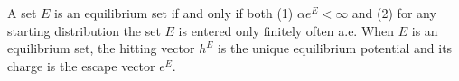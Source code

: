 A set $E$ is an equilibrium set if and only if both (1) $\alpha e^E < \infty$ and (2) for any starting distribution the set $E$ is entered only finitely often a.e. When $E$ is an equilibrium set, the hitting vector $h^E$ is the unique equilibrium potential and its charge is the escape vector $e^E$.